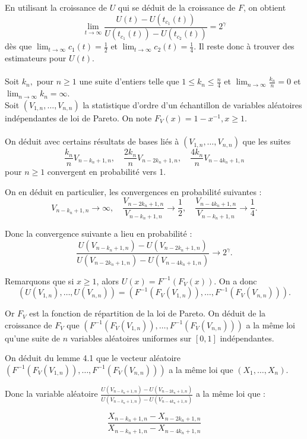 \documentclass{article}
\theoremstyle{plain}
\theoremstyle{definition}
\theoremstyle{plain}
\begin{document}
\noindent En utilisant la croissance de $U$ qui se déduit de la croissance de $F$, on obtient
\[
\lim_{t \to \infty} \frac{U(t) - U(t_{c_1}(t))}{U(t_{c_1}(t)) - U(t_{c_2}(t))} = 2^{\gamma}
\]
dès que $\lim_{t \to \infty} c_1(t) = \frac{1}{2}$ et $\lim_{t \to \infty} c_2(t) = \frac{1}{4}$. Il reste donc à trouver des estimateurs pour $U(t)$.
\\
\\
Soit $k_n,$ pour $ n \geq 1$ une suite d’entiers telle que $1 \leq k_n \leq \frac{n}{4}$ et $\lim_{n \to \infty} \frac{k_n}{n} = 0$ et $\lim_{n \to \infty} k_n = \infty$.
\\
Soit $(V_{1,n},\dots,V_{n,n})$ la statistique d’ordre d’un échantillon de variables aléatoires indépendantes de loi de Pareto. On note $F_V(x) = 1 - x^{-1}, x \geq 1$.
\\
\\
On déduit avec certains résultats de bases liés à $(V_{1,n},\dots,V_{n,n})$ que les suites
\[
\frac{k_n}{n} V_{n-k_n+1,n}, \quad \frac{2k_n}{n} V_{n-2k_n+1,n}, \quad \frac{4k_n}{n} V_{n-4k_n+1,n}
\]
pour \(n \geq 1\) convergent en probabilité vers 1.

On en déduit en particulier, les convergences en probabilité suivantes :
\[
V_{n-k_n+1,n}  \to \infty, \quad \frac{V_{n-2k_n+1,n}}{V_{n-k_n+1,n}} \to \frac{1}{2}, \quad \frac{V_{n-4k_n+1,n}}{V_{n-k_n+1,n}} \to \frac{1}{4}.
\]

Donc la convergence suivante a lieu en probabilité :
\[
\frac{U(V_{n-k_n+1,n}) - U(V_{n-2k_n+1,n})}{U(V_{n-2k_n+1,n}) - U(V_{n-4k_n+1,n})} \to 2^{\gamma}.
\]

Remarquons que si $x \geq 1$, alors $U(x) = F^{-1}(F_V(x))$. On a donc
\[
(U(V_{1,n}), \dots, U(V_{n,n})) = (F^{-1}(F_V(V_{1,n})), \dots, F^{-1}(F_V(V_{n,n}))).
\]

Or \(F_V\) est la fonction de répartition de la loi de Pareto. \newline
On déduit de la croissance de $F_V$ que $(F^{-1}(F_V(V_{1,n})),\dots, F^{-1}(F_V(V_{n,n})))$ a la même loi qu’une suite de $n$ variables aléatoires uniformes sur $[0,1]$ indépendantes. 

On déduit du lemme 4.1 que le vecteur aléatoire $(F^{-1}(F_V(V_{1,n})),\dots, F^{-1}(F_V(V_{n,n})))$ a la même loi que $(X_1,\dots,X_n)$. 

Donc la variable aléatoire \(\frac{U(V_{n-k_n+1,n}) - U(V_{n-2k_n+1,n})}{U(V_{n-k_n+1,n}) - U(V_{n-4k_n+1,n})}\) a la même loi que :

\[
\frac{X_{n-k_n+1,n} - X_{n-2k_n+1,n}}{X_{n-k_n+1,n} - X_{n-4k_n+1,n}}
\]
\end{document}
